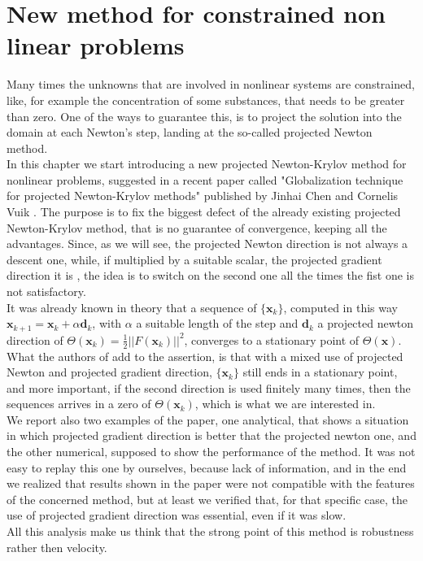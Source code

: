 \chapter{New method for constrained non linear problems}
Many times the unknowns that are involved in nonlinear systems are constrained, like, for example the concentration of some substances, that needs to be greater than zero. One of the ways to guarantee this, is to project the solution into the domain at each Newton's step, landing at the so-called projected Newton method.\\
 In this chapter we start introducing a new projected Newton-Krylov method for nonlinear problems, suggested in a recent paper called "Globalization technique for projected Newton-Krylov methods" published by Jinhai Chen and Cornelis Vuik \cite{MAIN}. The purpose is to fix the biggest defect of the already existing projected Newton-Krylov method, that is no guarantee of convergence, keeping all the advantages. Since, as we will see, the projected Newton direction is not always a descent one, while, if multiplied by a suitable scalar, the projected gradient direction it is , the idea is to switch on the second one all the times the fist one is not satisfactory.\\
 It was already known in theory that a sequence of $\{ \textbf{x}_k\} $, computed in this way $ \textbf{x}_{k+1} = \textbf{x}_{k} + \alpha \textbf{d}_k $, with $ \alpha $ a suitable length of the step and $ \textbf{d}_k $ a projected newton direction of $ \Theta (\textbf{x}_k) = \frac{1}{2} ||F (\textbf{x}_k)||^2$, converges to a stationary point of $ \Theta (\textbf{x}) $. What the authors of \cite{MAIN} add to the assertion, is that with a mixed use of projected Newton and projected gradient direction, $ \{\textbf{x}_k\} $ still ends in a stationary point, and more important, if the second direction is used finitely many times, then the sequences arrives in a zero of $ \Theta(\textbf{x}_k) $, which is what we are interested in.\\
 We report also two examples of the paper, one analytical, that shows a situation in which projected gradient direction is better that the projected newton one, and the other numerical, supposed to show the performance of the method. It was not easy to replay this one by ourselves, because lack of information, and in the end we realized that results shown in the paper were not compatible with the features of the concerned method, but at least we verified that, for that specific case, the use of projected gradient direction was essential, even if it was slow.\\
 All this analysis make us think that the strong point of this method is robustness rather then velocity.   

